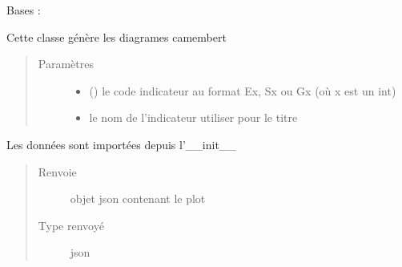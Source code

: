 \documentclass[letterpaper,10pt,french]{sphinxmanual}
\begin{document}
\begin{fulllineitems}
\label{\detokenize{app.home.content_gen:app.home.content_gen.graph_generation.PieChart}}
\sphinxAtStartPar
Bases : 

\sphinxAtStartPar
Cette classe génère les diagrames camembert
\begin{quote}\begin{description}
\item[{Paramètres}] \leavevmode\begin{itemize}
\item {} 
\sphinxAtStartPar
{} () \textendash{} le code indicateur au format Ex, Sx ou Gx (où x est un int)

\item {} 
\sphinxAtStartPar
{} \textendash{} le nom de l’indicateur utiliser pour le titre

\end{itemize}

\end{description}\end{quote}

\begin{fulllineitems}
\label{\detokenize{app.home.content_gen:app.home.content_gen.graph_generation.PieChart.plot}}
\sphinxAtStartPar
Les données sont importées depuis l’\_\_init\_\_
\begin{quote}\begin{description}
\item[{Renvoie}] \leavevmode
\sphinxAtStartPar
objet json contenant le plot

\item[{Type renvoyé}] \leavevmode
\sphinxAtStartPar
json

\end{description}\end{quote}

\end{fulllineitems}


\end{fulllineitems}
\end{document}
